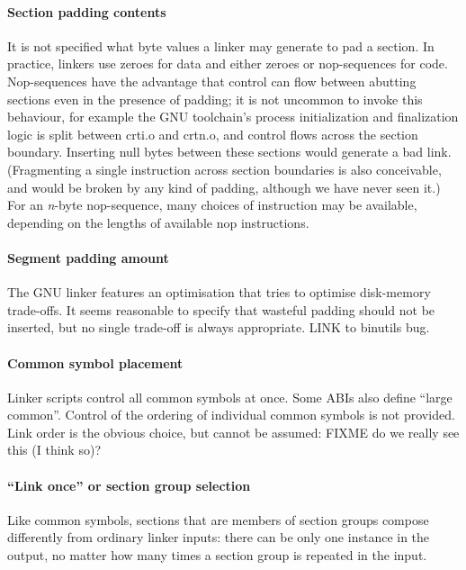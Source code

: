 \paragraph{Section padding contents}
It is not specified what byte values a linker may generate
to pad a section.
In practice, linkers use zeroes for data and either zeroes or nop-sequences for code.
Nop-sequences have the advantage that control can flow between abutting sections
even in the presence of padding; 
it is not uncommon to invoke this behaviour, 
for example 
the GNU toolchain's process initialization and finalization logic 
is split between \textsf{crti.o} and \textsf{crtn.o},
and control flows across the section boundary.
Inserting null bytes between these sections would generate a bad link.
(Fragmenting a single instruction across section boundaries
is also conceivable, and would be broken by any kind of padding, 
although we have never seen it.)
For an \textit{n}-byte nop-sequence, 
many choices of instruction may be available, 
depending on the lengths of available nop instructions.


\paragraph{Segment padding amount} 
The GNU linker features an optimisation
that tries to optimise disk-memory trade-offs.
It seems reasonable to specify that 
wasteful padding should not be inserted, but 
no single trade-off is always appropriate.
LINK to binutils bug.

\paragraph{Common symbol placement}
Linker scripts control all common symbols at once.
Some ABIs also define ``large common''.
Control of the ordering of individual common symbols
is not provided.
Link order is the obvious choice, but cannot be assumed: FIXME do we really see this (I think so)?

\paragraph{``Link once'' or section group selection}
Like common symbols, 
sections that are members of section groups compose differently
from ordinary linker inputs:
there can be only one instance in the output, no matter how many times
a section group is repeated in the input.

